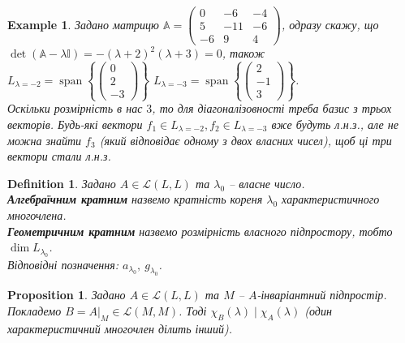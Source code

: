 \documentclass[a4paper, 10pt]{article}
\theoremstyle{theoremdd}
\newtheorem{definition}[theorem]{Definition}
\newtheorem{example}[theorem]{Example}
\newtheorem{proposition}[theorem]{Proposition}
\DeclareMathOperator{\linspan}{span}
\begin{document}
\begin{example}
\label{non_diagonalizable_because_not_enough_dim}
Задано матрицю $\mathbb{A} = \begin{pmatrix}
0 & -6 & -4 \\
5 & -11 & -6 \\
-6 & 9 & 4
\end{pmatrix}$, одразу скажу, що\\
$\det (\mathbb{A} - \lambda \mathbb{I}) = -(\lambda+2)^2(\lambda+3)=0$, також\\
$L_{\lambda = -2} = \linspan \left\{ \begin{pmatrix}
0 \\ 2 \\ -3
\end{pmatrix} \right\}$ \hspace{2cm}
$L_{\lambda = -3} = \linspan \left\{ \begin{pmatrix}
2 \\ -1 \\ 3
\end{pmatrix} \right\}$.\\
Оскільки розмірність в нас $3$, то для діагоналізовності треба базис з трьох векторів. Будь-які вектори $f_1 \in L_{\lambda = -2}, f_2 \in L_{\lambda = -3}$ вже будуть л.н.з., але не можна знайти $f_3$ (який відповідає одному з двох власних чисел), щоб ці три вектори стали л.н.з.
\end{example}

\begin{definition}
Задано $A \in \mathcal{L}(L,L)$ та $\lambda_0$ -- власне число.\\
\textbf{Алгебраїчним кратним} назвемо кратність кореня $\lambda_0$ характеристичного многочлена.\\
\textbf{Геометричним кратним} назвемо розмірність власного підпростору, тобто $\dim L_{\lambda_0}$.\\
Відповідні позначення: $a_{\lambda_0},\ g_{\lambda_0}$.
\end{definition}

\begin{proposition}
Задано $A \in \mathcal{L}(L,L)$ та $M$ -- $A$-інваріантний підпростір. Покладемо $B = A|_{M} \in \mathcal{L}(M,M)$. Тоді $\chi_B(\lambda) \mid \chi_A(\lambda)$ (один характеристичний многочлен ділить інший).
\end{proposition}
\end{document}

